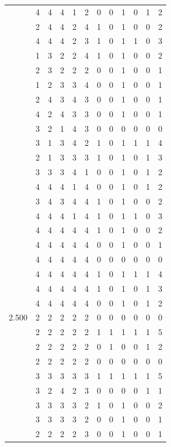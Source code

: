 \documentclass[]{book}
\theoremstyle{definition}
\theoremstyle{definition}
\theoremstyle{definition}
\theoremstyle{remark}
\begin{document}
\begin{table}
{\begin{tabular}[t]{rrrrrrrrrrrr}
 & 4 & 4 & 4 & 1 & 2 & 0 & 0 & 1 & 0 & 1 & 2\\
 & 2 & 4 & 4 & 2 & 4 & 1 & 0 & 1 & 0 & 0 & 2\\
 & 4 & 4 & 4 & 2 & 3 & 1 & 0 & 1 & 1 & 0 & 3\\
 & 1 & 3 & 2 & 2 & 4 & 1 & 0 & 1 & 0 & 0 & 2\\
 & 2 & 3 & 2 & 2 & 2 & 0 & 0 & 1 & 0 & 0 & 1\\
 & 1 & 2 & 3 & 3 & 4 & 0 & 0 & 1 & 0 & 0 & 1\\
 & 2 & 4 & 3 & 4 & 3 & 0 & 0 & 1 & 0 & 0 & 1\\
 & 4 & 2 & 4 & 3 & 3 & 0 & 0 & 1 & 0 & 0 & 1\\
 & 3 & 2 & 1 & 4 & 3 & 0 & 0 & 0 & 0 & 0 & 0\\
 & 3 & 1 & 3 & 4 & 2 & 1 & 0 & 1 & 1 & 1 & 4\\
 & 2 & 1 & 3 & 3 & 3 & 1 & 0 & 1 & 0 & 1 & 3\\
 & 3 & 3 & 3 & 4 & 1 & 0 & 0 & 1 & 0 & 1 & 2\\
 & 4 & 4 & 4 & 1 & 4 & 0 & 0 & 1 & 0 & 1 & 2\\
 & 3 & 4 & 3 & 4 & 4 & 1 & 0 & 1 & 0 & 0 & 2\\
 & 4 & 4 & 4 & 1 & 4 & 1 & 0 & 1 & 1 & 0 & 3\\
 & 4 & 4 & 4 & 4 & 4 & 1 & 0 & 1 & 0 & 0 & 2\\
 & 4 & 4 & 4 & 4 & 4 & 0 & 0 & 1 & 0 & 0 & 1\\
 & 4 & 4 & 4 & 4 & 4 & 0 & 0 & 0 & 0 & 0 & 0\\
 & 4 & 4 & 4 & 4 & 4 & 1 & 0 & 1 & 1 & 1 & 4\\
 & 4 & 4 & 4 & 4 & 4 & 1 & 0 & 1 & 0 & 1 & 3\\
 & 4 & 4 & 4 & 4 & 4 & 0 & 0 & 1 & 0 & 1 & 2\\
2.500 & 2 & 2 & 2 & 2 & 2 & 0 & 0 & 0 & 0 & 0 & 0\\
 & 2 & 2 & 2 & 2 & 2 & 1 & 1 & 1 & 1 & 1 & 5\\
 & 2 & 2 & 2 & 2 & 2 & 0 & 1 & 0 & 0 & 1 & 2\\
 & 2 & 2 & 2 & 2 & 2 & 0 & 0 & 0 & 0 & 0 & 0\\
 & 3 & 3 & 3 & 3 & 3 & 1 & 1 & 1 & 1 & 1 & 5\\
 & 3 & 2 & 4 & 2 & 3 & 0 & 0 & 0 & 0 & 1 & 1\\
 & 3 & 3 & 3 & 3 & 2 & 1 & 0 & 1 & 0 & 0 & 2\\
 & 3 & 3 & 3 & 3 & 2 & 0 & 0 & 1 & 0 & 0 & 1\\
 & 2 & 2 & 2 & 2 & 3 & 0 & 0 & 1 & 0 & 0 & 1\\

\end{tabular}}
\end{table}
\end{document}
